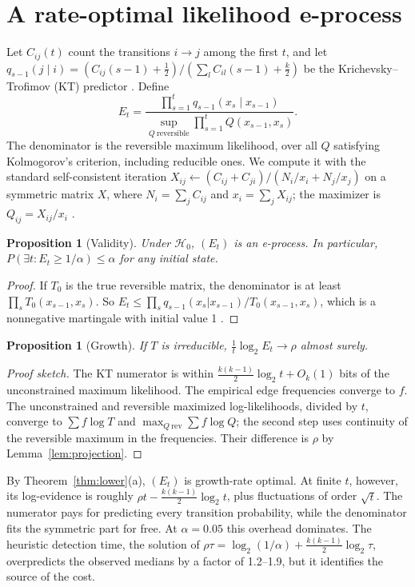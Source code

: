 \documentclass[11pt]{article}
\newtheorem{proposition}[theorem]{Proposition}
\theoremstyle{definition}
\theoremstyle{remark}
\newcommand{\Hnull}{\mathcal{H}_0}
\begin{document}
\section{A rate-optimal likelihood e-process}\label{sec:likelihood}

Let $C_{ij}(t)$ count the transitions $i\to j$ among the first $t$, and let $q_{s-1}(j\mid i)=(C_{ij}(s-1)+\frac12)/(\sum_lC_{il}(s-1)+\frac k2)$ be the Krichevsky--Trofimov (KT) predictor \cite{kt1981}. Define
\[
E_t=\frac{\prod_{s=1}^tq_{s-1}(x_s\mid x_{s-1})}{\sup_{Q\ \text{reversible}}\prod_{s=1}^tQ(x_{s-1},x_s)}.
\]
The denominator is the reversible maximum likelihood, over all $Q$ satisfying Kolmogorov's criterion, including reducible ones. We compute it with the standard self-consistent iteration $X_{ij}\leftarrow(C_{ij}+C_{ji})/(N_i/x_i+N_j/x_j)$ on a symmetric matrix $X$, where $N_i=\sum_jC_{ij}$ and $x_i=\sum_jX_{ij}$; the maximizer is $Q_{ij}=X_{ij}/x_i$ \cite{trendelkamp2015}.

\begin{proposition}[Validity]\label{prop:ui}
Under $\Hnull$, $(E_t)$ is an e-process. In particular, $P(\exists t:E_t\ge1/\alpha)\le\alpha$ for any initial state.
\end{proposition}
\begin{proof}
If $T_0$ is the true reversible matrix, the denominator is at least $\prod_sT_0(x_{s-1},x_s)$. So $E_t\le\prod_sq_{s-1}(x_s|x_{s-1})/T_0(x_{s-1},x_s)$, which is a nonnegative martingale with initial value 1 \cite{wasserman2020}.
\end{proof}

\begin{proposition}[Growth]\label{prop:growth}
If $T$ is irreducible, $\frac1t\log_2E_t\to\rho$ almost surely.
\end{proposition}
\begin{proof}[Proof sketch]
The KT numerator is within $\frac{k(k-1)}2\log_2t+O_k(1)$ bits of the unconstrained maximum likelihood. The empirical edge frequencies converge to $f$. The unconstrained and reversible maximized log-likelihoods, divided by $t$, converge to $\sum f\log T$ and $\max_{Q\ \text{rev}}\sum f\log Q$; the second step uses continuity of the reversible maximum in the frequencies. Their difference is $\rho$ by Lemma~\ref{lem:projection}.
\end{proof}

By Theorem~\ref{thm:lower}(a), $(E_t)$ is growth-rate optimal. At finite $t$, however, its log-evidence is roughly $\rho t-\frac{k(k-1)}2\log_2t$, plus fluctuations of order $\sqrt t$. The numerator pays for predicting every transition probability, while the denominator fits the symmetric part for free. At $\alpha=0.05$ this overhead dominates. The heuristic detection time, the solution of $\rho\tau=\log_2(1/\alpha)+\frac{k(k-1)}2\log_2\tau$, overpredicts the observed medians by a factor of 1.2--1.9, but it identifies the source of the cost.
\end{document}
